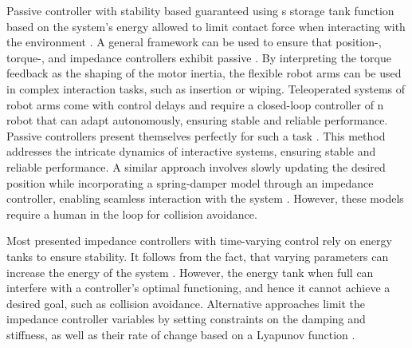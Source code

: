 Passive controller with stability based guaranteed using s storage tank function based on the system's energy allowed to limit contact force when interacting with the environment \cite{kishi2003passive}.
A general framework can be used to ensure that position-, torque-, and impedance controllers exhibit passive \cite{albu2007unified}. By interpreting the torque feedback as the shaping of the motor inertia, the flexible robot arms can be used in complex interaction tasks, such as insertion or wiping.
Teleoperated systems of robot arms come with control delays and require a closed-loop controller of n robot that can adapt autonomously, ensuring stable and reliable performance. Passive controllers present themselves perfectly for such a task  \cite{stramigioli2005sampled}. This method addresses the intricate dynamics of interactive systems, ensuring stable and reliable performance.
A similar approach involves slowly updating the desired position while incorporating a spring-damper model through an impedance controller, enabling seamless interaction with the system \cite{lee2010passive}.
However, these models require a human in the loop for collision avoidance.

Most presented impedance controllers with time-varying control rely on energy tanks to ensure stability. 
It follows from the fact, that varying parameters can increase the energy of the system \cite{ferraguti2013tank}. However, the energy tank when full can interfere with a controller's optimal functioning, and hence it cannot achieve a desired goal, such as collision avoidance.
Alternative approaches limit the impedance controller variables  by setting constraints on the damping and stiffness, as well as their rate of change based on a Lyapunov function \cite{kronander2016stability}.

